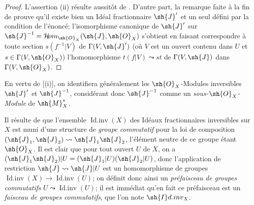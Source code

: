 \begin{proof}
L'assertion (ii) résulte aussitôt de .
D'autre part, la remarque faite à la fin de  prouve qu'il existe bien un Idéal fractionnaire $\sh{J}'$ et un seul défini par la condition de l'énoncé;
l'isomorphisme canonique de $\sh{J}'$ sur $\sh{J}^{-1}=\shHom_{\sh{O}_X}(\sh{J},\sh{O}_X)$ s'obtient en faisant correspondre à toute section $s(f^{-1}|V)$ de $\Gamma(V,\sh{J}')$ (où $V$ est un ouvert contenu dans $U$ et $s\in\Gamma(V,\sh{O}_X)$) l'homomorphisme $t(f|V)\leadsto st$ de $\Gamma(V,\sh{J})$ dans $\Gamma(V,\sh{O}_X)$.
\end{proof}

En vertu de [(i)], on identifiera généralement les $\sh{O}_X$-Modules inversibles $\sh{J}'$ et $\sh{J}^{-1}$, considérant donc $\sh{J}^{-1}$ comme un \emph{sous-$\sh{O}_X$-Module} de $\sh{M}_X^*$.

\begin{env}[21.2.4]
\label{IV.21.2.4}
Il résulte de  que l'ensemble $\operatorname{Id.inv}(X)$ des Idéaux fractionnaires inversibles sur $X$ est muni d'une structure de \emph{groupe commutatif} pour la loi de composition $(\sh{J}_1,\sh{J}_2)\leadsto\sh{J}_1\sh{J}_2$, l'élément neutre de ce groupe étant $\sh{O}_X$.
Il est clair que pour tout ouvert $U$ de $X$, on a $(\sh{J}_1\sh{J}_2)|U=(\sh{J}_1|U)(\sh{J}_2|U)$, donc l'application de restriction $\sh{J}\leadsto\sh{J}|U$ est un homomorphisme de groupes $\operatorname{Id.inv}(X)\to\operatorname{Id.inv}(U)$;
on définit donc ainsi un \emph{préfaisceau de groupes commutatifs} $U\leadsto\operatorname{Id.inv}(U)$;
il est immédiat qu'en fait ce préfaisceau est un \emph{faisceau de groupes commutatifs}, que l'on note $\sh{I}d.inv_X$.
\end{env}

